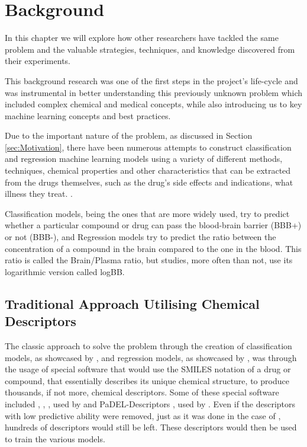 \chapter{Background}
\label{ch:Background}

In this chapter we will explore how other researchers have tackled the same problem and the valuable strategies, techniques, and knowledge discovered from their experiments.

This background research was one of the first steps in the project's life-cycle and was instrumental in better understanding this previously unknown problem which included complex chemical and medical concepts, while also introducing us to key machine learning concepts and best practices.

Due to the important nature of the problem, as discussed in Section \ref{sec:Motivation}, there have been numerous attempts to construct classification and regression machine learning models using a variety of different methods, techniques, chemical properties and other characteristics that can be extracted from the drugs themselves, such as the drug's side effects and indications, what illness they treat. \citep{Singh2020,Saber2020,Zhao2007,Gao2017,Zhang2008}. 

 Classification models, being the ones that are more widely used, try to predict whether a particular compound or drug can pass the blood-brain barrier (BBB+) or not (BBB-), and Regression models try to predict the ratio between the concentration of a compound in the brain compared to the one in the blood. This ratio is called the Brain/Plasma ratio, but studies, more often than not, use its logarithmic version called logBB.

\section{Traditional Approach Utilising Chemical Descriptors}

The classic approach to solve the problem through the creation of classification models, as showcased by \citet{Singh2020}, and regression models, as showcased by \citet{Zhang2008}, was through the usage of special software that would use the SMILES notation of a drug or compound, that essentially describes its unique chemical structure, to produce thousands, if not more, chemical descriptors. Some of these special software included \citet{Molconn-Z}, \citet{MOE}, \citet{Dragon}, used by \citet{Zhang2008} and PaDEL-Descriptors \citep{Yap2011}, used by \citet{Singh2020}. Even if the descriptors with low predictive ability were removed, just as it was done in the case of \citet{Singh2020}, hundreds of descriptors would still be left. These descriptors would then be used to train the various models.

